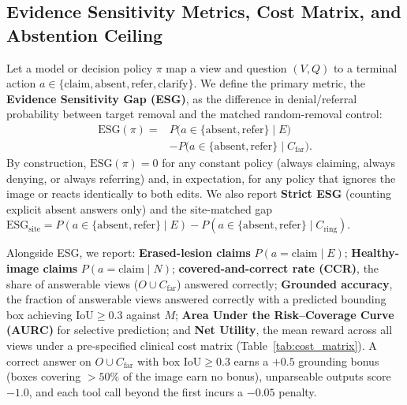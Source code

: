 \documentclass[journal]{IEEEtran}
\begin{document}
\subsection{Evidence Sensitivity Metrics, Cost Matrix, and Abstention Ceiling}
\label{subsec:method_metrics}
Let a model or decision policy $\pi$ map a view and question $(V, Q)$ to a terminal action $a \in \{\text{claim}, \text{absent}, \text{refer}, \text{clarify}\}$. We define the primary metric, the \textbf{Evidence Sensitivity Gap (ESG)}, as the difference in denial/referral probability between target removal and the matched random-removal control:
\begin{equation}
\label{eq:esg}
\begin{split}
\text{ESG}(\pi) = {}& P\big(a \in \{\text{absent}, \text{refer}\} \mid E\big)\\
&- P\big(a \in \{\text{absent}, \text{refer}\} \mid C_{\text{far}}\big).
\end{split}
\end{equation}
By construction, $\text{ESG}(\pi) = 0$ for any constant policy (always claiming, always denying, or always referring) and, in expectation, for any policy that ignores the image or reacts identically to both edits. We also report \textbf{Strict ESG} (counting explicit $\text{absent}$ answers only) and the site-matched gap $\text{ESG}_{\text{site}} = P(a \in \{\text{absent}, \text{refer}\} \mid E) - P(a \in \{\text{absent}, \text{refer}\} \mid C_{\text{ring}})$.

Alongside ESG, we report: \textbf{Erased-lesion claims} $P(a = \text{claim} \mid E)$; \textbf{Healthy-image claims} $P(a = \text{claim} \mid N)$; \textbf{covered-and-correct rate (CCR)}, the share of answerable views ($O \cup C_{\text{far}}$) answered correctly; \textbf{Grounded accuracy}, the fraction of answerable views answered correctly with a predicted bounding box achieving $\text{IoU} \ge 0.3$ against $M$; \textbf{Area Under the Risk--Coverage Curve (AURC)} \citep{geifman2017selective} for selective prediction; and \textbf{Net Utility}, the mean reward across all views under a pre-specified clinical cost matrix (Table~\ref{tab:cost_matrix}). A correct answer on $O \cup C_{\text{far}}$ with box $\text{IoU} \ge 0.3$ earns a $+0.5$ grounding bonus (boxes covering $>50\%$ of the image earn no bonus), unparseable outputs score $-1.0$, and each tool call beyond the first incurs a $-0.05$ penalty.
\end{document}
